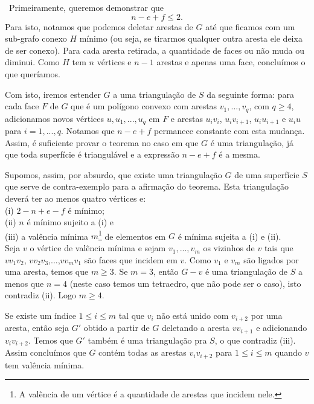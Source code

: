 \documentclass[12pt,a4paper]{article}
\def\dem{\par\smallbreak\noindent {\textit{ Demonstração:}} \ }
\theoremstyle{definition}
\begin{document}
\dem Primeiramente, queremos demonstrar que $$n-e+f \leq 2.$$ Para isto, notamos que podemos deletar arestas de $G$ até que ficamos com um sub-grafo conexo $H$ mínimo (ou seja, se tirarmos qualquer outra aresta ele deixa de ser conexo). Para cada aresta retirada, a quantidade de faces ou não muda ou diminui. Como $H$ tem $n$ vértices e $n-1$ arestas e apenas uma face, concluímos o que queríamos. 

Com isto, iremos estender $G$ a uma triangulação de $S$ da seguinte forma: para cada face $F$ de $G$ que é um polígono convexo com arestas $v_1,...,v_q$, com $q\geq 4$, adicionamos novos vértices $u,u_1,...,u_q$ em $F$ e arestas $u_i v_i$, $u_i v_{i+1}$, $u_i u_{i+1}$ e $u_i u$ para $i=1,...,q$. Notamos que $n-e+f$ permanece constante com esta mudança. Assim, é suficiente provar o teorema no caso em que $G$ é uma triangulação, já que toda superfície é triangulável e a expressão $n-e+f$ é a mesma.

Supomos, assim, por absurdo, que existe uma triangulação $G$ de uma superfície $S$ que serve de contra-exemplo para a afirmação do teorema. Esta triangulação deverá ter ao menos quatro vértices e: \\

(i) $2-n+e-f$ é mínimo; \\

(ii) $n$ é mínimo sujeito a (i) e \\

(iii) a valência mínima $m$\footnote{A valência de um vértice é a quantidade de arestas que incidem nele.} de elementos em $G$ é mínima sujeita a (i) e (ii). \\

Seja $v$ o vértice de valência mínima e sejam $v_1,...,v_m$ os vizinhos de $v$ tais que $v v_1v_2$, $v v_2 v_3$,...,$v v_m v_1$ são faces que incidem em $v$. Como $v_1$ e $v_m$ são ligados por uma aresta, temos que $m\geq 3$. Se $m=3$, então $G-v$ é uma triangulação de $S$ a menos que $n=4$ (neste caso temos um tetraedro, que não pode ser o caso), isto contradiz (ii). Logo $m\geq 4$.

Se existe um índice $1\leq i \leq m$ tal que $v_i$ não está unido com $v_{i+2}$ por uma aresta, então seja $G'$ obtido a partir de $G$ deletando a aresta $v v_{i+1}$ e adicionando $v_i v_{i+2}$. Temos que $G'$ também é uma triangulação pra $S$, o que contradiz (iii). Assim concluímos que $G$ contém todas as arestas $v_iv_{i+2}$ para $1\leq i \leq m$ quando $v$ tem valência mínima.
\end{document}
